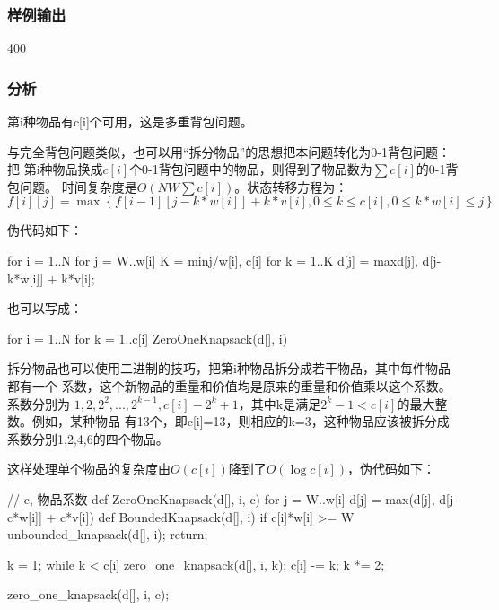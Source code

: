 \subsubsection{样例输出}
\begin{Code}
400
\end{Code}

\subsubsection{分析}
第i种物品有c[i]个可用，这是多重背包问题。

与完全背包问题类似，也可以用“拆分物品”的思想把本问题转化为0-1背包问题：把
第i种物品换成$c[i]$个0-1背包问题中的物品，则得到了物品数为$\sum c[i]$的0-1背包问题。
时间复杂度是$O(NW\sum c[i])$。状态转移方程为：
$$f[i][j]=\max\left\{f[i-1][j-k*w[i]]+k*v[i], 0 \leq k \leq c[i], 0 \leq k*w[i] \leq j\right\}$$

伪代码如下：
\begin{Code}
for i = 1..N
    for j = W..w[i]
        K = min{j/w[i], c[i]}
        for k = 1..K
            d[j] = max{d[j], d[j-k*w[i]] + k*v[i]};
\end{Code}

也可以写成：
\begin{Code}
for i = 1..N
    for k = 1..c[i]
        ZeroOneKnapsack(d[], i)
\end{Code}

拆分物品也可以使用二进制的技巧，把第i种物品拆分成若干物品，其中每件物品都有一个
系数，这个新物品的重量和价值均是原来的重量和价值乘以这个系数。系数分别为
$1,2,2^2,...,2^{k-1},c[i]-2^k+1$，其中k是满足$2^k-1<c[i]$的最大整数。例如，某种物品
有13个，即c[i]=13，则相应的k=3，这种物品应该被拆分成系数分别1,2,4,6的四个物品。

这样处理单个物品的复杂度由$O(c[i])$降到了$O(\log c[i])$，伪代码如下：
\begin{Code}
// c, 物品系数
def ZeroOneKnapsack(d[], i, c)
    for j = W..w[i]
        d[j] = max(d[j], d[j-c*w[i]] + c*v[i])
def BoundedKnapsack(d[], i)
    if c[i]*w[i] >= W
        unbounded_knapsack(d[], i);
        return;

    k = 1;
    while k < c[i]
        zero_one_knapsack(d[], i, k);
        c[i] -= k;
        k *= 2;

    zero_one_knapsack(d[], i, c);
\end{Code}

